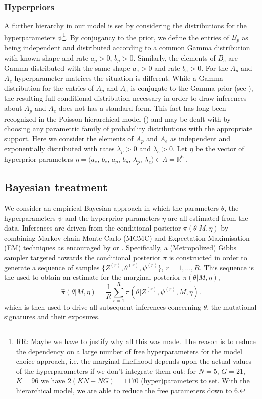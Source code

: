 \documentclass{bioinfo}
\begin{document}
\subsubsection{Hyperpriors} 
A further hierarchy in our model is set by considering the
distributions for the hyperparameters $\psi$\footnote{RR: Maybe we
have to justify why all this was made. The reason is to reduce the
dependency on a large number of free hyperparameters for the model
choice approach, i.e. the marginal likelihood depends upon the actual
values of the hyperparameters if we don't integrate them out: for
$N=5$, $G=21$, $K=96$ we have $2(KN+NG)=1170$ (hyper)parameters to
set. With the hierarchical model, we are able to reduce the free
parameters down to 6.}. By conjugancy to the prior, we
define the entries of $B_p$ as being independent and distributed
according to a common Gamma distribution with known shape and rate
$a_p > 0$, $b_p > 0$. Similarly, the elements of $B_e$ are Gamma
distributed with the same shape $a_e>0$ and rate $b_e>0$. For the
$A_p$ and $A_e$ hyperparameter matrices the situation is
different. While a Gamma distribution for the entries of $A_p$ and
$A_e$ is conjugate to the Gamma prior (see \citealp{M}), the resulting
full conditional distribution necessary in order to draw inferences
about $A_p$ and $A_e$ does not has a standard form.  This fact has
long been recognized in the Poisson hierarchical model
(\citealp{GMS93}) and may be dealt with by choosing any parametric
family of probability distributions with the appropriate support. Here
we consider the elements of $A_p$ and $A_e$ as independent and
exponentially distributed with rates $\lambda_p > 0$ and $\lambda_e >
0$.  Let $\eta$ be the vector of hyperprior parameters $\eta = (a_e$,
$b_e$, $a_p$, $b_p$, $\lambda_p$, $\lambda_e) \in \Lambda = \mathbb
R_+^6$.

\subsection{Bayesian treatment}
We consider an empirical Bayesian approach in which the parameters
$\theta$, the hyperparameters $\psi$ and the hyperprior parameters
$\eta$ are all estimated from the data.  Inferences are driven from
the conditional posterior $\pi(\theta|M, \eta)$ by combining
Markov chain Monte Carlo (MCMC) and Expectation Maximisation (EM)
techniques as encouraged by \cite{C01} or \cite{LC}. Specifically, a
(Metropolized) Gibbs sampler targeted towards the conditional
posterior $\pi$ is constructed in order to generate a sequence of
samples $\{Z^{(r)}, \theta^{(r)}, \psi^{(r)}\}$, $r = 1, \ldots,
R$. This sequence is the used to obtain an estimate for the marginal 
posterior $\pi(\theta|M, \eta)$, 
\[
   \hat{\pi}(\theta|M, \eta) 
 = 
   \frac{1}{R}\sum_{r=1}^R \pi(\theta|Z^{(r)}, \psi^{(r)}, M, \eta). 
\]
which is then used to drive all subsequent inferences concerning
$\theta$, the mutational signatures and their exposures.
\end{document}
